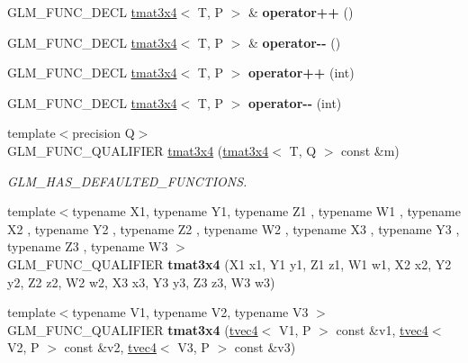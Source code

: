 \begin{DoxyCompactItemize}
G\+L\+M\+\_\+\+F\+U\+N\+C\+\_\+\+D\+E\+CL \hyperlink{structglm_1_1tmat3x4}{tmat3x4}$<$ T, P $>$ \& {\bfseries operator++} ()
\item 
\mbox{\label{structglm_1_1tmat3x4_a5198a23b569931c189191afb025d46e2}} 
G\+L\+M\+\_\+\+F\+U\+N\+C\+\_\+\+D\+E\+CL \hyperlink{structglm_1_1tmat3x4}{tmat3x4}$<$ T, P $>$ \& {\bfseries operator-\/-\/} ()
\item 
\mbox{\label{structglm_1_1tmat3x4_a6c7a0194f873068b10b4e1404cba0a89}} 
G\+L\+M\+\_\+\+F\+U\+N\+C\+\_\+\+D\+E\+CL \hyperlink{structglm_1_1tmat3x4}{tmat3x4}$<$ T, P $>$ {\bfseries operator++} (int)
\item 
\mbox{\label{structglm_1_1tmat3x4_a21eeeba593a5e46ece34f418f43f7a3b}} 
G\+L\+M\+\_\+\+F\+U\+N\+C\+\_\+\+D\+E\+CL \hyperlink{structglm_1_1tmat3x4}{tmat3x4}$<$ T, P $>$ {\bfseries operator-\/-\/} (int)
\item 
\mbox{\label{structglm_1_1tmat3x4_a2f48d00df66c48b9d37f53aed6bcdec7}} 
{\footnotesize template$<$precision Q$>$ }\\G\+L\+M\+\_\+\+F\+U\+N\+C\+\_\+\+Q\+U\+A\+L\+I\+F\+I\+ER \hyperlink{structglm_1_1tmat3x4_a2f48d00df66c48b9d37f53aed6bcdec7}{tmat3x4} (\hyperlink{structglm_1_1tmat3x4}{tmat3x4}$<$ T, Q $>$ const \&m)
\begin{DoxyCompactList}\small\item\em G\+L\+M\+\_\+\+H\+A\+S\+\_\+\+D\+E\+F\+A\+U\+L\+T\+E\+D\+\_\+\+F\+U\+N\+C\+T\+I\+O\+NS. \end{DoxyCompactList}\item 
\mbox{\label{structglm_1_1tmat3x4_a98439a8c3c24d4185e3e96148d8fbee2}} 
{\footnotesize template$<$typename X1, typename Y1, typename Z1 , typename W1 , typename X2 , typename Y2 , typename Z2 , typename W2 , typename X3 , typename Y3 , typename Z3 , typename W3 $>$ }\\G\+L\+M\+\_\+\+F\+U\+N\+C\+\_\+\+Q\+U\+A\+L\+I\+F\+I\+ER {\bfseries tmat3x4} (X1 x1, Y1 y1, Z1 z1, W1 w1, X2 x2, Y2 y2, Z2 z2, W2 w2, X3 x3, Y3 y3, Z3 z3, W3 w3)
\item 
\mbox{\label{structglm_1_1tmat3x4_a9388a3a74c10e23d0fd00611b04d1fd0}} 
{\footnotesize template$<$typename V1, typename V2, typename V3 $>$ }\\G\+L\+M\+\_\+\+F\+U\+N\+C\+\_\+\+Q\+U\+A\+L\+I\+F\+I\+ER {\bfseries tmat3x4} (\hyperlink{structglm_1_1tvec4}{tvec4}$<$ V1, P $>$ const \&v1, \hyperlink{structglm_1_1tvec4}{tvec4}$<$ V2, P $>$ const \&v2, \hyperlink{structglm_1_1tvec4}{tvec4}$<$ V3, P $>$ const \&v3)

\end{DoxyCompactItemize}

